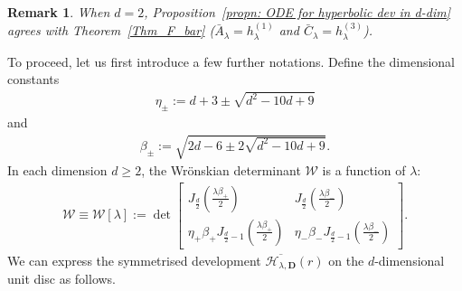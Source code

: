 \documentclass[11pt,a4paper,english,reqno]{amsart}
\theoremstyle{plain}
\newtheorem{remark}[definition]{Remark}
\newcommand{\1}{\mathbbm{1}}
\begin{document}
\begin{remark}
When $d=2$, Proposition~\ref{propn: ODE for hyperbolic dev in d-dim} agrees with Theorem~\ref{Thm_F_bar} ($\bar{A}_\lambda = h_\lambda^{(1)}$ and $\bar{C}_\lambda = h_\lambda^{(3)}$). 
\end{remark}


To proceed, let us first introduce a few further notations. Define the dimensional constants
\begin{align*}
\eta_\pm:= d+3 \pm \sqrt{d^2-10d+9}
\end{align*}
and
\begin{align*}
\beta_\pm:=\sqrt{2d-6 \pm 2 \sqrt{d^2-10d+9}}.
\end{align*}
In each dimension $d \geq 2$, the Wr\"{o}nskian determinant $\mathcal{W}$ is a function of $\lambda$:
\begin{align}\label{wronskian, arb dim}
\mathcal{W} \equiv \mathcal{W}[\lambda] :=  \det\begin{bmatrix} 
J_{\frac{d}{2}}\left(\frac{\lambda\beta_+}{2}\right)  & J_{\frac{d}{2}}\left(\frac{\lambda\beta_-}{2}\right)\\
\eta_+\beta_+ J_{\frac{d}{2}-1}\left(\frac{\lambda\beta_+}{2}\right) & \eta_-\beta_- J_{\frac{d}{2}-1}\left(\frac{\lambda\beta_-}{2}\right)
\end{bmatrix}.
\end{align}
We can express the symmetrised development $\overline{\mathcal{H}_{\lambda, \mathbf{D}}}(r)$ on the $d$-dimensional unit disc as follows.
 
\end{document}
